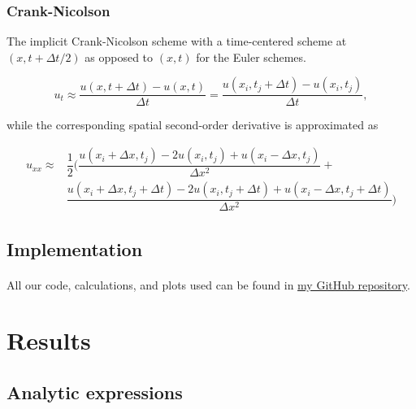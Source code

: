 \documentclass[a4paper, fontsize=11pt]{article}
\begin{document}
\subsubsection{Crank-Nicolson}

The implicit Crank-Nicolson scheme with a time-centered scheme at \\ $(x, t+\Delta t /2)$ as opposed to $(x, t)$ for the Euler schemes.

\begin{equation}
u_{t} \approx \dfrac{u(x, t+ \Delta t) - u(x, t)}{\Delta t} = \dfrac{u(x_{i}, t_{j}+ \Delta t) - u(x_{i}, t_{j})}{\Delta t},
\end{equation}

while the corresponding spatial second-order derivative is approximated as

\begin{align}
u_{xx} \approx &\dfrac{1}{2} \Bigg(\dfrac{u(x_{i} + \Delta x, t_{j}) - 2u(x_{i}, t_{j}) + u(x_{i} - \Delta x, t_{j})}{\Delta x^2} +
\\
&\dfrac{u(x_{i} + \Delta x, t_{j} + \Delta t) - 2u(x_{i}, t_{j}+ \Delta t) + u(x_{i} - \Delta x, t_{j}+ \Delta t)}{\Delta x^2}\Bigg)
\end{align}

\subsection{ }
\cite{statphys} \cite{IPDE}


\subsection{Implementation}



\paragraph{}
All our code, calculations, and plots used can be found in \href{https://github.com/MariusHolm/FYS4150}{my GitHub repository}. 

\section{Results}


\subsection{Analytic expressions}
\end{document}
